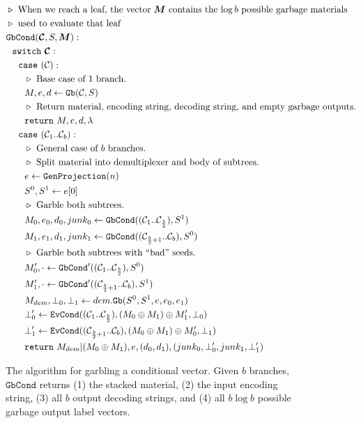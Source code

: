 \documentclass[]{llncs}
\newcommand{\cir}{\ensuremath{\mathcal C}}
\newcommand{\mmat}{\ensuremath{\vec{M}}}
\newcommand{\gb}{\ensuremath{\mathtt{Gb}}\xspace}
\newcommand{\evcond}{\ensuremath{\mathtt{EvCond}}\xspace}
\newcommand{\gbcond}{\ensuremath{\mathtt{GbCond}}\xspace}
\newcommand{\genprojection}{\ensuremath{\mathtt{GenProjection}}\xspace}
\newcommand{\codecomment}[1]{\triangleright~\text{#1}}
\newcommand{\switch}{\ensuremath{\mathtt{switch}}\xspace}
\newcommand{\ccase}{\ensuremath{\mathtt{case}}\xspace}
\newcommand{\creturn}{\ensuremath{\mathtt{return}}\xspace}
\begin{document}
\begin{figure}
  \begin{align*}
    &\codecomment{When we reach a leaf, the vector \mmat\ contains the
  $\log b$ possible garbage materials}\\
    &\codecomment{used to evaluate that leaf}\\
    &\gbcond(\vec{\cir}, S, \mmat):\\
    &~~\switch~\vec{\cir}:\\
    &~~~~\ccase~(\cir):\\
    &~~~~~~\codecomment{Base case of $1$ branch.}\\
    &~~~~~~M, e, d \gets \gb(\cir, S)\\
    &~~~~~~\codecomment{Return material, encoding string, decoding string, and empty garbage outputs.}\\
    &~~~~~~\creturn~M, e, d, \lambda\\
    &~~~~\ccase~(\cir_1..\cir_b):\\
    &~~~~~~\codecomment{General case of $b$ branches.}\\
    &~~~~~~\codecomment{Split material into demultiplexer and body of subtrees.}\\
    &~~~~~~e \gets \genprojection(n)\\
    &~~~~~~S^0, S^1 \gets e[0]\\
    &~~~~~~\codecomment{Garble both subtrees.}\\
    &~~~~~~M_0,e_0,d_0,junk_0 \gets \gbcond((\cir_1..\cir_{\frac{b}{2}}), S^1)\\
    &~~~~~~M_1,e_1,d_1,junk_1 \gets \gbcond((\cir_{\frac{b}{2}+1}..\cir_b), S^0)\\
    &~~~~~~\codecomment{Garble both subtrees with ``bad'' seeds.}\\
    &~~~~~~M_0',\cdot \gets \gbcond'((\cir_1..\cir_{\frac{b}{2}}), S^0)\\
    &~~~~~~M_1',\cdot \gets \gbcond'((\cir_{\frac{b}{2}+1}..\cir_b), S^1)\\
    &~~~~~~M_{dem},\bot_0, \bot_1 \gets dem.\gb(S^0, S^1, e, e_0, e_1)\\
    &~~~~~~\bot_0' \gets \evcond((\cir_1..\cir_{\frac{b}{2}}), (M_0 \oplus M_1) \oplus M_1', \bot_0)\\
    &~~~~~~\bot_1' \gets \evcond((\cir_{\frac{b}{2}+1}..\cir_b), (M_0 \oplus M_1) \oplus M_0', \bot_1)\\
    &~~~~~~\creturn~M_{dem}|(M_0\oplus M_1), e, (d_0,d_1), (junk_0,\bot_0',junk_1,\bot_1')
  \end{align*}
  \caption{%
    The algorithm for garbling a conditional vector.
    Given $b$ branches, \gbcond returns (1) the stacked material, (2)
    the input encoding string, (3) all $b$ output decoding strings,
    and (4) all $b\log b$ possible garbage output label vectors.
  }
\end{figure}
\end{document}
